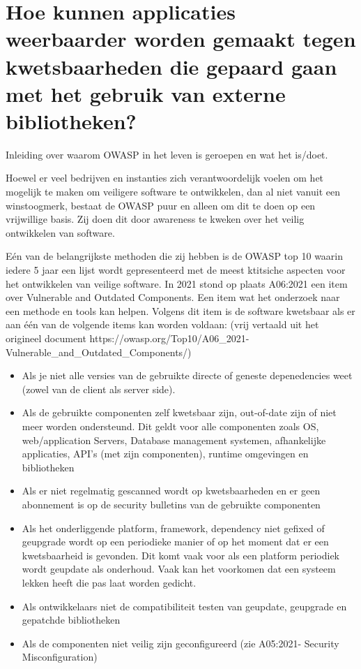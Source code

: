 \section{Hoe kunnen applicaties weerbaarder worden gemaakt tegen kwetsbaarheden die gepaard gaan met het gebruik van externe bibliotheken?}\label{sec:hoe-kan-er-voorkomen-worden-dat-er-kkwetsbaarheden-onstaan-in-een-applicatie-die-gebruik-maakt-van-externe-bibliotheken?} %

Inleiding over waarom OWASP in het leven is geroepen en wat het is/doet.

Hoewel er veel bedrijven en instanties zich verantwoordelijk voelen om het mogelijk te maken om veiligere software te ontwikkelen, dan al niet vanuit een winstoogmerk, bestaat de OWASP puur en alleen om dit te doen op een vrijwillige basis. Zij doen dit door awareness te kweken over het veilig ontwikkelen van software.

Eén van de belangrijkste methoden die zij hebben is de OWASP top 10 waarin iedere 5 jaar een lijst wordt gepresenteerd met de meest ktitsiche aspecten voor het ontwikkelen van veilige software. In 2021 stond op plaats A06:2021 een item over Vulnerable and Outdated Components. Een item wat het onderzoek naar een methode en tools kan helpen. Volgens dit item is de software kwetsbaar als er aan één van de volgende items kan worden voldaan: (vrij vertaald uit het origineel document https://owasp.org/Top10/A06\_2021-Vulnerable\_and\_Outdated\_Components/)
\begin{itemize}
    \item Als je niet alle versies van de gebruikte directe of geneste depenedencies weet (zowel van de client als server side).
    \item Als de gebruikte componenten zelf kwetsbaar zijn, out-of-date zijn of niet meer worden ondersteund. Dit geldt voor alle componenten zoals OS, web/application Servers, Database management systemen, afhankelijke applicaties, API's (met zijn componenten), runtime omgevingen en bibliotheken
    \item Als er niet regelmatig gescanned wordt op kwetsbaarheden en er geen abonnement is op de security bulletins van de gebruikte componenten
    \item Als het onderliggende platform, framework, dependency niet gefixed of geupgrade wordt op een periodieke manier of op het moment dat er een kwetsbaarheid is gevonden. Dit komt vaak voor als een platform periodiek wordt geupdate als onderhoud. Vaak kan het voorkomen dat een systeem lekken heeft die pas laat worden gedicht.
    \item Als ontwikkelaars niet de compatibiliteit testen van geupdate, geupgrade en gepatchde bibliotheken
    \item Als de componenten niet veilig zijn geconfigureerd (zie A05:2021- Security Misconfiguration)
\end{itemize}

